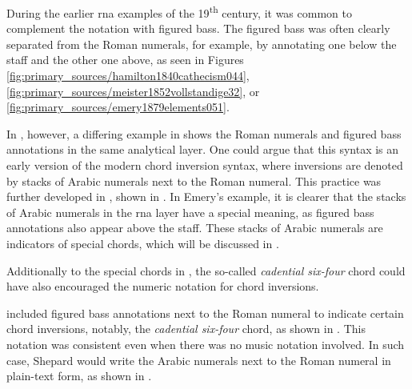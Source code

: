 
During the earlier \gls{rna} examples of the
19\textsuperscript{th} century, it was common to complement
the notation with figured bass. The figured bass was often
clearly separated from the Roman numerals, for example, by
annotating one below the staff and the other one above, as
seen in Figures
\ref{fig:primary_sources/hamilton1840cathecism044},
\ref{fig:primary_sources/meister1852vollstandige32}, or
\ref{fig:primary_sources/emery1879elements051}.

In ,
however, a differing example in
\textcite{bussler1878praktische} shows the Roman numerals
and figured bass annotations in the same analytical layer.
One could argue that this syntax is an early version of the
modern chord inversion syntax, where inversions are denoted
by stacks of Arabic numerals next to the Roman numeral. This
practice was further developed in
\textcite{emery1879elements}, shown in
. In Emery's
example, it is clearer that the stacks of Arabic numerals in
the \gls{rna} layer have a special meaning, as figured bass
annotations also appear above the staff. These stacks of
Arabic numerals are indicators of special chords, which will
be discussed in
.



Additionally to the special chords in
\textcite{emery1879elements}, the so-called \emph{cadential
six-four} chord could have also encouraged the numeric
notation for chord inversions.

\textcite{shepard1896harmony} included figured bass
annotations next to the Roman numeral to indicate certain
chord inversions, notably, the \emph{cadential six-four}
chord, as shown in
. This
notation was consistent even when there was no music
notation involved. In such case, Shepard would write the
Arabic numerals next to the Roman numeral in plain-text
form, as shown in
.

